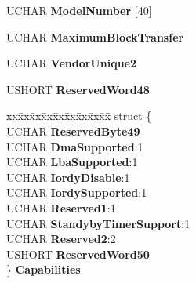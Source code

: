 \begin{DoxyCompactItemize}
U\+C\+H\+AR {\bfseries Model\+Number} \mbox{[}40\mbox{]}
\item 
\mbox{\label{struct___i_d_e_n_t_i_f_y___d_e_v_i_c_e___d_a_t_a_aa847fd0a2b05ba850903864e0da7e2b6}} 
U\+C\+H\+AR {\bfseries Maximum\+Block\+Transfer}
\item 
\mbox{\label{struct___i_d_e_n_t_i_f_y___d_e_v_i_c_e___d_a_t_a_aea6f75391a8bae58976b1cc185f0d3a0}} 
U\+C\+H\+AR {\bfseries Vendor\+Unique2}
\item 
\mbox{\label{struct___i_d_e_n_t_i_f_y___d_e_v_i_c_e___d_a_t_a_a9c5e06c40b097e6e6140b995129f8d56}} 
U\+S\+H\+O\+RT {\bfseries Reserved\+Word48}
\item 
\mbox{\label{struct___i_d_e_n_t_i_f_y___d_e_v_i_c_e___d_a_t_a_a22b1e36dc73f1dde33b82fd427b9f0e8}} 
\begin{tabbing}
xx\=xx\=xx\=xx\=xx\=xx\=xx\=xx\=xx\=\kill
struct \{\\
\>UCHAR {\bfseries ReservedByte49}\\
\>UCHAR {\bfseries DmaSupported}:1\\
\>UCHAR {\bfseries LbaSupported}:1\\
\>UCHAR {\bfseries IordyDisable}:1\\
\>UCHAR {\bfseries IordySupported}:1\\
\>UCHAR {\bfseries Reserved1}:1\\
\>UCHAR {\bfseries StandybyTimerSupport}:1\\
\>UCHAR {\bfseries Reserved2}:2\\
\>USHORT {\bfseries ReservedWord50}\\
\} {\bfseries Capabilities}\\


\end{tabbing}
\end{DoxyCompactItemize}
